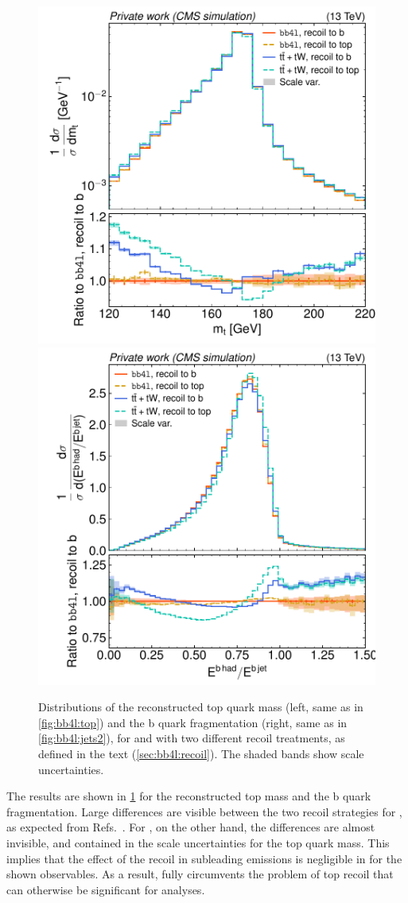 \begin{figure}[tp]
    \centering
    \includegraphics[width=0.49 \textwidth]{figures/bb4l/recoil/MC_TTBAR_DILEP_SPINDENSITY_anytop_mass.pdf}
    \hfill
    \includegraphics[width=0.49 \textwidth]{figures/bb4l/recoil/MC_HFJETS_efracB.pdf}
    \caption{Distributions of the reconstructed top quark mass (left, same as in \cref{fig:bb4l:top}) and the b quark fragmentation (right, same as in \cref{fig:bb4l:jets2}), for \bbfourl and \tttWsum with two different recoil treatments, as defined in the text (\cref{sec:bb4l:recoil}). The shaded bands show scale uncertainties.}
    \label{fig:bb4l:recoil}
\end{figure}

The results are shown in \cref{fig:bb4l:recoil} for the reconstructed top mass and the b quark fragmentation. Large differences are visible between the two recoil strategies for \tttWsum, as expected from Refs.~\cite{Brooks:2019xso,ATLAS:2022jbw}. For \bbfourl, on the other hand, the differences are almost invisible, and contained in the scale uncertainties for the top quark mass. This implies that the effect of the recoil in subleading emissions is negligible in \bbfourl for the shown observables. As a result, \bbfourl fully circumvents the problem of top recoil that can otherwise be significant for \ttbar analyses.

